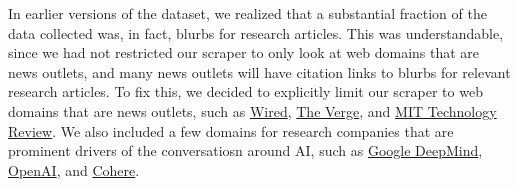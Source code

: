 In earlier versions of the dataset, we realized that a substantial fraction of the data collected
was, in fact, blurbs for research articles. This was understandable, since we had not
restricted our scraper to only look at web domains that are news outlets,
and many news outlets will have citation links to blurbs for relevant research articles.
To fix this, we decided to explicitly limit our scraper to web domains
that are news outlets, such as
\href{https://www.wired.com}{Wired},
\href{https://www.theverge.com}{The Verge}, and
\href{https://www.technologyreview.com}{MIT Technology Review}.
We also included a few domains for research companies that are prominent drivers
of the conversatiosn around AI, such as
\href{https://deepmind.google}{Google DeepMind},
\href{https://openai.com}{OpenAI},
and \href{https://txt.cohere.com}{Cohere}.
